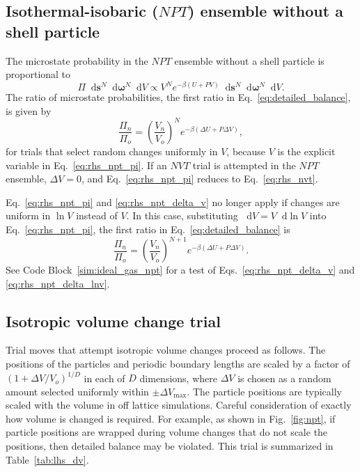 \documentclass[
  9pt,
  bestpractices,
]{livecoms}
\newcommand*\diff{\mathop{}\!\mathrm{d}}
\begin{document}
\subsection{\label{sec:rhs_npt_shell}Isothermal-isobaric ($NPT$) ensemble without a shell particle}

The microstate probability in the $NPT$ ensemble without a shell particle is proportional to \cite{wood_monte_1968, allen_computer_1989, frenkel_understanding_2002}
\begin{equation}
\Pi \diff\mathbf{s}^{N}\diff\boldsymbol{\omega}^{N}\diff V \propto V^{N} e^{-\beta(U+P V)} \diff\mathbf{s}^{N} \diff\boldsymbol{\omega}^{N}\diff V.
\label{eq:rhs_npt_pi}
\end{equation}
The ratio of microstate probabilities, the first ratio in Eq.~\ref{eq:detailed_balance}, is given by
\begin{equation}
\frac{\Pi_n}{\Pi_o} = \left(\frac{V_n}{V_o}\right)^{N}e^{-\beta(\Delta U + P\Delta V)},
\label{eq:rhs_npt_delta_v}
\end{equation}
for trials that select random changes uniformly in $V$, because $V$ is the explicit variable in Eq.~\ref{eq:rhs_npt_pi}.
If an $NVT$ trial is attempted in the $NPT$ ensemble, $\Delta V=0$, and Eq.~\ref{eq:rhs_npt_pi} reduces to Eq.~\ref{eq:rhs_nvt}.

Eq.~\ref{eq:rhs_npt_pi} and \ref{eq:rhs_npt_delta_v} no longer apply if changes are uniform in $\ln V$ instead of $V$.
In this case, substituting $\diff V=V\diff\ln V$ into Eq.~\ref{eq:rhs_npt_pi}, the first ratio in Eq.~\ref{eq:detailed_balance} is
\begin{equation}
\frac{\Pi_n}{\Pi_o} = \left(\frac{V_n}{V_o}\right)^{N+1}e^{-\beta(\Delta U + P\Delta V)}.
\label{eq:rhs_npt_delta_lnv}
\end{equation}
See Code Block~\ref{sim:ideal_gas_npt} for a test of Eqs.~\ref{eq:rhs_npt_delta_v} and \ref{eq:rhs_npt_delta_lnv}.

\subsection{\label{sec:lhs_dv}Isotropic volume change trial}

Trial moves that attempt isotropic volume changes proceed as follows.
The positions of the particles and periodic boundary lengths are scaled by a factor of $(1+\Delta V/V_o)^{1/D}$ in each of $D$ dimensions, where $\Delta V$ is chosen as a random amount selected uniformly within $\pm\Delta V_{\mathrm{max}}$.
The particle positions are typically scaled with the volume in off lattice simulations.
Careful consideration of exactly how volume is changed is required.
For example, as shown in Fig.~\ref{fig:npt}, if particle positions are wrapped during volume changes that do not scale the positions, then detailed balance may be violated.
This trial is summarized in Table~\ref{tab:lhs_dv}.
\end{document}
